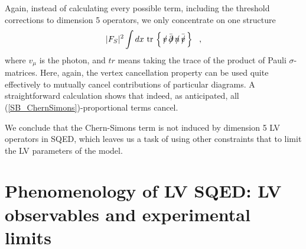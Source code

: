 \documentclass[12pt]{revtex4}
\newcommand{\slashed}[1]{\hbox{{$#1$}\llap{$/$}}}
\begin{document}
Again, instead of calculating every possible term, including the threshold corrections 
to dimension 5 operators, we only concentrate on one structure 
\begin{equation}
\label{SB_ChernSimons}
|F_S|^2 \int dx ~ \mathrm{tr} \,\left\{\, 
      \slashed{v} \, \bar{\slashed{\partial}} \,
      \slashed{n} \, \bar{\slashed{v}} \,
                              \right\}
~~,
\end{equation}
where $ v_\mu $ is the photon, and $ tr $ means
taking the trace of the product of Pauli 
$ \sigma $-matrices.
Here, again, the vertex cancellation property
can be used quite effectively to mutually cancel 
contributions of particular diagrams.
A straightforward calculation shows that indeed,
as anticipated, all (\ref{SB_ChernSimons})-proportional terms cancel.



We conclude that  the Chern-Simons term is not induced
by dimension 5 LV operators in SQED, which leaves us a task of 
    using other constraints that \cite{CFJ} to limit the LV parameters of the model.




\section{Phenomenology of LV SQED: LV observables and experimental limits}
\label{Reduction}
\end{document}
